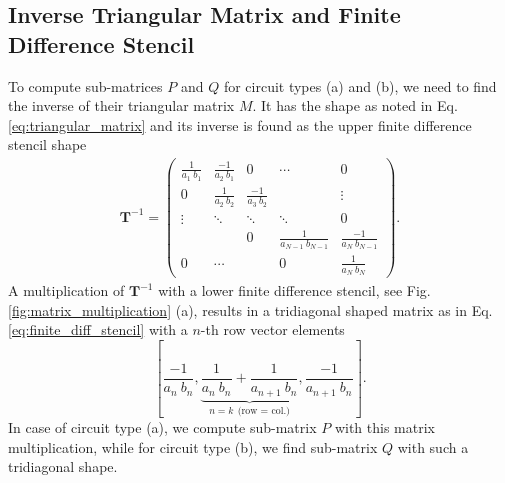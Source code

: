 \documentclass[a4paper, 10pt, twoside, twocolumn]{scrartcl}
\begin{document}
\subsection*{Inverse Triangular Matrix and Finite Difference Stencil}
To compute sub-matrices $P$ and $Q$ for circuit types (a) and (b), we need to find the inverse of their triangular matrix $M$. It has the shape as noted in Eq. \eqref{eq:triangular_matrix} and its inverse is found as the upper finite difference stencil shape 
\begin{align*}
	\mathbf{T}^{-1} = 
	\begin{pmatrix}
		\frac{1}{a_{1} ~ b_{1}} & \frac{-1}{a_{2} ~ b_{1}} & 0  						& \cdots & 0 \\[1ex]
		0 						 &   \frac{1}{a_{2} ~ b_{2}} & \frac{-1}{a_{3} ~ b_{2}} &  & \vdots \\
		\vdots 				 		 &  \ddots 					 & \ddots 					 & \ddots & 0	 \\
		&  & 0 & \frac{1}{a_{N-1} ~ b_{N-1}} & \frac{-1}{a_{N} ~ b_{N-1}} \\[1ex]
		0  & \cdots 	& &  			0			   & \frac{1}{a_{N} ~ b_{N}} 
	\end{pmatrix} \text{.}
\end{align*}
A multiplication of $\mathbf{T}^{-1}$ with a lower finite difference stencil, see Fig. \ref{fig:matrix_multiplication} (a), results in a tridiagonal shaped matrix as in Eq. \eqref{eq:finite_diff_stencil} with a $n$-th row vector elements 
\begin{equation*}
	\left[ \frac{-1}{a_{n}~ b_{n}},  \underbrace{\frac{1}{a_{n}~ b_{n}} + \frac{1}{a_{n+1}~ b_{n}}}_{n = k ~~ \text{(row = col.)}}, \frac{-1}{a_{n+1}~ b_{n}}\right] \text{.}
\end{equation*}
In case of circuit type (a), we compute sub-matrix $P$ with this matrix multiplication, while for circuit type (b), we find sub-matrix $Q$ with such a tridiagonal shape.
\end{document}
